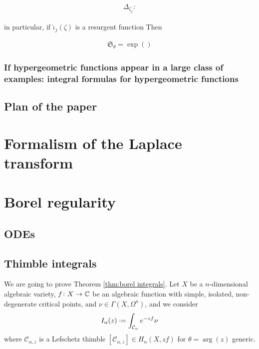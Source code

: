 \documentclass[11pt,a4paper,twoside,leqno,noamsfonts]{amsart}
\numberwithin{equation}{section}
\begin{document}
\begin{align*}
\Delta_{\zeta_j}\colon 
\end{align*} 

in particular, if $\hat{\iota}_j(\zeta)$ is a resurgent function 
Then 

\begin{align*}
\mathfrak{S}_{\theta}= \exp\left(\right)
\end{align*}



\subsubsection{If hypergeometric functions appear in a large class of examples: integral formulas for hypergeometric functions }

\subsection{Plan of the paper}

\section{Formalism of the Laplace transform}

\section{Borel regularity}

\subsection{ODEs}

\subsection{Thimble integrals}
We are going to prove Theorem \ref{thm:borel integrals}. 
Let $X$ be a $n$-dimensional algebraic variety, $f\colon X\to\mathbb C$ be an algebraic function with simple, isolated, non-degenerate critical points, and $\nu\in\Gamma(X,\Omega^n)$, and we consider
\begin{equation}
I_{\alpha}(z)\defeq\int_{\mathcal{C}_\alpha}e^{-zf}\nu
\end{equation}
where $\mathcal{C}_{\alpha,z}$ is a Lefschetz thimble $[\mathcal{C}_{\alpha,z}]\in H_n(X,zf)$ for $\theta=\arg(z)$ generic. 
\end{document}
